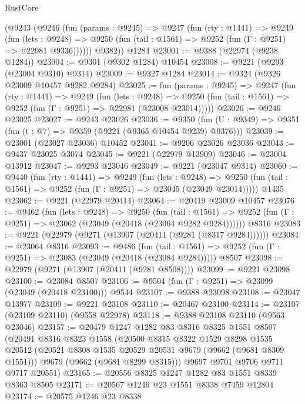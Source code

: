 \begin{lexlean}{RustCore}
\begin{coremodule}
      (@9243
        (@9246
          (fun (params : @9245) =>
          @9247
            (fun (rty : @1441) =>
            @9249
              (fun (lets : @9248) =>
              @9250 (fun (tail : @1561) => @9252 (fun (Γ : @9251) => @22981 @9336))))))
        @9382))
    @1284
@23001 := @9388 (@22974 (@9238 @1284))
@23004 := @9301 (@9302 @1284) @10454
@23008 := @9221 (@9293 (@23004 @9310) @9314)
@23009 := @9327 @1284
@23014 := @9324 (@9326 @23009 @10457 @9282 @9284)
@23025 := fun (params : @9245) =>
  @9247
    (fun (rty : @1441) =>
    @9249
      (fun (lets : @9248) =>
      @9250 (fun (tail : @1561) => @9252 (fun (Γ : @9251) => @22981 (@23008 @23014)))))
@23026 := @9246 @23025
@23027 := @9243 @23026
@23036 := @9350
    (fun (U : @9349) => @9351 (fun (t : @7) => @9359 (@9221 (@9365 @10454 @9239) @9376)))
@23039 := @23001 (@23027 @23036) @10452
@23041 := @9206 @23026 @23036
@23043 := @9437 @23025 @3074
@23045 := @9221 (@22979 @13909)
@23046 := @23004 @13912
@23047 := @9293 @23046
@23049 := @9221 (@23047 @9314)
@23060 := @9440
    (fun (rty : @1441) =>
    @9249
      (fun (lets : @9248) =>
      @9250 (fun (tail : @1561) => @9252 (fun (Γ : @9251) => @23045 (@23049 @23014)))))
    @1435
@23062 := @9221 (@22979 @20414)
@23064 := @20419 @23009 @10457
@23076 := @9462
    (fun (lets : @9248) =>
    @9250
      (fun (tail : @1561) =>
      @9252 (fun (Γ : @9251) => @23062 (@23049 (@20418 (@23064 @9282 @9284))))))
    @8316
@23083 := @9221 (@22979 (@9271 (@13907 (@20411 (@9281 (@8317 @9284))))))
@23084 := @23064 @8316
@23093 := @9486
    (fun (tail : @1561) => @9252 (fun (Γ : @9251) => @23083 (@23049 (@20418 (@23084 @9284)))))
    @8507
@23098 := @22979 (@9271 (@13907 (@20411 (@9281 @8508))))
@23099 := @9221 @23098
@23100 := @23084 @8507
@23106 := @9504 (fun (Γ : @9251) => @23099 (@23049 (@20418 @23100))) @9544
@23107 := @9388 @23098
@23108 := @23047 @13977
@23109 := @9221 @23108
@23110 := @20467 @23100
@23114 := @23107 (@23109 @23110) (@9558 @22978)
@23118 := @9388 @23108 @23110 (@9563 @23046)
@23157 := @20479
    @1247
    @1282
    @83
    @8316
    @8325
    @1551
    @8507
    (@20491
      @8316
      @8323
      @1558
      (@20500
        @8315
        @8322
        @1529
        @8298
        @1535
        @20512
        (@20521 @8308 @1535 @20529 @20531 @9679 (@9662 (@9681 @8309 @1551)))
        @9679
        (@9662 (@9681 @8299 @8315)))
      @9697
      @9701
      @9706
      @9711
      @9717
      @20551)
@23165 := @20556 @8325 @1247 @1282 @83 @1551 @8339 @8363 @8505
@23171 := @20567 @1246 @23 @1551 @8338 @7459 @12804
@23174 := @20575 @1246 @23 @8338

\end{coremodule}
\end{lexlean}
